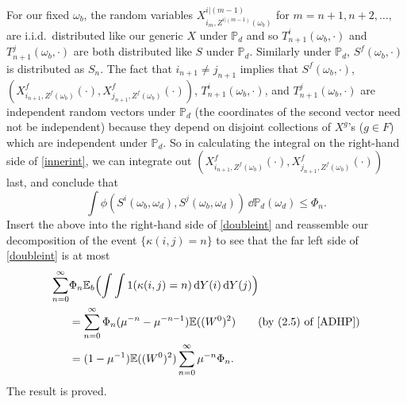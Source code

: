 \documentclass[12pt]{article}
\makeatletter
\renewenvironment{proof}[1][\proofname]{%
\par\pushQED{\qed}\normalfont%
\topsep6\p@\@plus6\p@\relax
\trivlist\item[\hskip\labelsep\bfseries#1\@addpunct{.}]%
\ignorespaces
}{%
\popQED\endtrivlist\@endpefalse
}
\numberwithin{theorem}{section}
\theoremstyle{def}
\numberwithin{equation}{section}
\renewcommand{\P}{\mathbb{P}}
\newcommand{\E}{\mathbb{E}}
\makeatother
\begin{document}
\begin{proof}
For our fixed $\omega_b$, the random variables $X^{i|(m-1)}_{i_m,Z^{i|(m-1)}(\omega_b)}$ for $m=n+1,n+2,\dots,$ are i.i.d.\ distributed like our generic $X$ under $\P_d$ and so $T^i_{n+1}(\omega_b,\cdot)$ and $T^j_{n+1}(\omega_b,\cdot)$ are both distributed like $S$ under $\P_d$.
Similarly under $\P_d$, $S^f(\omega_b,\cdot)$ is distributed as $S_n$. The fact that $i_{n+1}\neq j_{n+1}$ implies that $S^f(\omega_b,\cdot)$, $(X^f_{i_{n+1},Z^f(\omega_b)}(\cdot),X^f_{j_{n+1},Z^f(\omega_b)}(\cdot))$, $T^{i}_{n+1}(\omega_b,\cdot)$, and $T^{j}_{n+1}(\omega_b,\cdot)$ are independent random vectors under $\P_d$ (the coordinates of the second vector need not be independent) because they depend on disjoint collections of $X^g$'s ($g\in F$) which are independent under $\P_d$. So in calculating the integral on the right-hand side of \eqref{innerint}, we can integrate out $(X^f_{i_{n+1},Z^f(\omega_b)}(\cdot),X^f_{j_{n+1},Z^f(\omega_b)}(\cdot))$ last, and conclude that
\begin{equation*}
\int\phi(S^i(\omega_b,\omega_d),S^j(\omega_b,\omega_d))\,\dd \P_d(\omega_d)\le \Phi_n.
\end{equation*}
Insert the above into the right-hand side of \eqref{doubleint} and reassemble our decomposition of the event $\{\kappa(i,j)=n\}$ to see that the far left side of \eqref{doubleint} is at most
\begin{align*}
\sum_{n=0}^\infty& \Phi_n\E_b\Bigl(\int\int1(\kappa(i,j)=n)\,\dd Y(i)\,\dd Y(j)\Bigr)\\
&=\sum_{n=0}^\infty \Phi_n (\mu^{-n}-\mu^{-n-1})\E((W^0)^2)\qquad\text{(by (2.5) of \cite{ADHP}})\\
&=(1-\mu^{-1})\E((W^0)^2)\sum_{n=0}^\infty \mu^{-n}\Phi_n.
\end{align*}
The result is proved. 
\end{proof}
\end{document}
